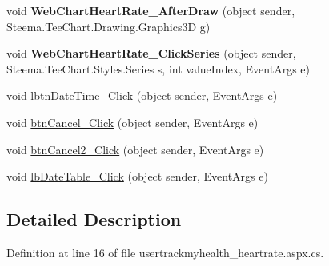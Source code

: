 \begin{DoxyCompactItemize}
\item 
\hypertarget{classusertrackmyhealth__heartrate_a9c5c6f944a30a1cb6fd9f2af28edb54f}{void {\bfseries Web\-Chart\-Heart\-Rate\-\_\-\-After\-Draw} (object sender, Steema.\-Tee\-Chart.\-Drawing.\-Graphics3\-D g)}\label{classusertrackmyhealth__heartrate_a9c5c6f944a30a1cb6fd9f2af28edb54f}

\item 
\hypertarget{classusertrackmyhealth__heartrate_ad3a288e20dfd2c8ef82b73adcacc84a2}{void {\bfseries Web\-Chart\-Heart\-Rate\-\_\-\-Click\-Series} (object sender, Steema.\-Tee\-Chart.\-Styles.\-Series s, int value\-Index, Event\-Args e)}\label{classusertrackmyhealth__heartrate_ad3a288e20dfd2c8ef82b73adcacc84a2}

\item 
void \hyperlink{classusertrackmyhealth__heartrate_abf59083cf5ad7372b842eb9675663f34}{lbtn\-Date\-Time\-\_\-\-Click} (object sender, Event\-Args e)
\item 
void \hyperlink{classusertrackmyhealth__heartrate_aebb8dd945996feee1b0297e3dd9d80cd}{btn\-Cancel\-\_\-\-Click} (object sender, Event\-Args e)
\item 
void \hyperlink{classusertrackmyhealth__heartrate_a8eb3ee91e2ab197491ac96caf7fdfb1f}{btn\-Cancel2\-\_\-\-Click} (object sender, Event\-Args e)
\item 
void \hyperlink{classusertrackmyhealth__heartrate_a8215193da23262154f7bbe9b19066029}{lb\-Date\-Table\-\_\-\-Click} (object sender, Event\-Args e)
\end{DoxyCompactItemize}


\subsection{Detailed Description}


Definition at line 16 of file usertrackmyhealth\-\_\-heartrate.\-aspx.\-cs.



